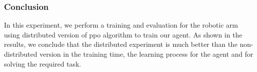 \subsubsection{Conclusion}

In this experiment, we perform a training and evaluation for the robotic arm using distributed version of ppo algorithm to train our agent. As shown in the results, we conclude that the distributed experiment is much better than the non-distributed version in the training time, the learning process for the agent and for solving the required task.